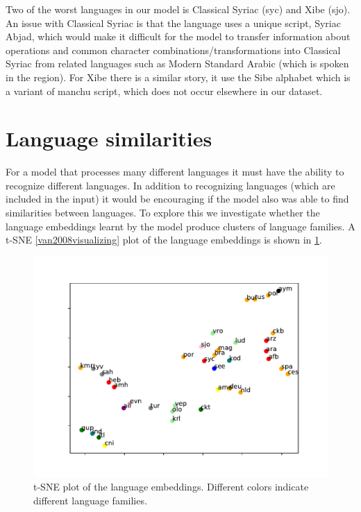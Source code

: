 \documentclass[11pt,a4paper]{article}
\begin{document}
Two of the worst languages in our model is Classical Syriac (syc) and
Xibe (sjo).  An issue with Classical Syriac is that the language uses
a unique script, Syriac Abjad, which would make it difficult for the
model to transfer information about operations and common character
combinations/transformations into Classical Syriac from related
languages such as Modern Standard Arabic (which is spoken in the
region). For Xibe there is a similar story, it use the Sibe alphabet
which is a variant of manchu script, which does not occur elsewhere in
our dataset.



\section{Language similarities}

For a model that processes many different languages it must have the
ability to recognize different languages.  In addition to recognizing
languages (which are included in the input) it would be encouraging if
the model also was able to find similarities between languages.  To
explore this we investigate whether the language embeddings learnt by
the model produce clusters of language families. A t-SNE
\cref{van2008visualizing} plot of the language embeddings is shown in
\cref{fig:lang_tsne}.

\begin{figure}[ht]
\centering
\includegraphics[scale=0.5]{lang_tsne.pdf}
\caption{\label{fig:lang_tsne} t-SNE plot of the language
embeddings. Different colors indicate different language families.}
\end{figure}
\end{document}
